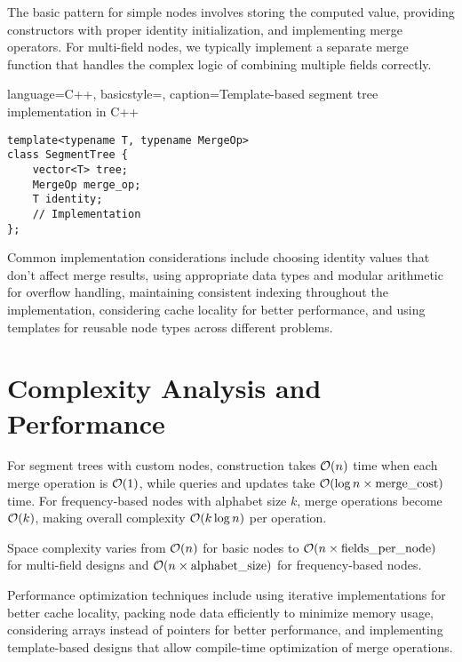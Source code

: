 The basic pattern for simple nodes involves storing the computed value, providing constructors with proper identity initialization, and implementing merge operators. For multi-field nodes, we typically implement a separate merge function that handles the complex logic of combining multiple fields correctly.

\begin{marginlisting}[0pt]{language=C++, basicstyle=\ttfamily\scriptsize, caption=Template-based segment tree implementation in C++}
\begin{lstlisting}
template<typename T, typename MergeOp>
class SegmentTree {
    vector<T> tree;
    MergeOp merge_op;
    T identity;
    // Implementation
};
\end{lstlisting}
\end{marginlisting}

Common implementation considerations include choosing identity values that don't affect merge results, using appropriate data types and modular arithmetic for overflow handling, maintaining consistent indexing throughout the implementation, considering cache locality for better performance, and using templates for reusable node types across different problems.

\section{Complexity Analysis and Performance}

For segment trees with custom nodes, construction takes $\mathcal{O}(n)$ time when each merge operation is $\mathcal{O}(1)$, while queries and updates take $\mathcal{O}(\log n \times \text{merge\_cost})$ time. For frequency-based nodes with alphabet size $k$, merge operations become $\mathcal{O}(k)$, making overall complexity $\mathcal{O}(k \log n)$ per operation.


Space complexity varies from $\mathcal{O}(n)$ for basic nodes to $\mathcal{O}(n \times \text{fields\_per\_node})$ for multi-field designs and $\mathcal{O}(n \times \text{alphabet\_size})$ for frequency-based nodes.

Performance optimization techniques include using iterative implementations for better cache locality, packing node data efficiently to minimize memory usage, considering arrays instead of pointers for better performance, and implementing template-based designs that allow compile-time optimization of merge operations.

